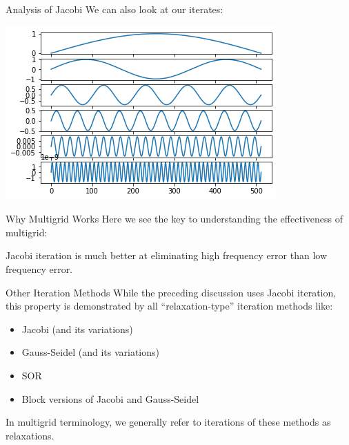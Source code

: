 \documentclass[11pt]{beamer}
\begin{document}
\begin{frame}{Analysis of Jacobi}
  We can also look at our iterates:
  \begin{center}
    \includegraphics[width=\linewidth]{output_14_0.png}
  \end{center}
\end{frame}
\begin{frame}{Why Multigrid Works}
  Here we see the key to understanding the effectiveness of multigrid:

  Jacobi iteration is much better at eliminating high frequency error than low frequency error.
\end{frame}
\begin{frame}{Other Iteration Methods}
  While the preceding discussion uses Jacobi iteration, this property is
  demonstrated by all ``relaxation-type'' iteration methods like:
  \begin{itemize}
    \item Jacobi (and its variations)
    \item Gauss-Seidel (and its variations)
    \item SOR
    \item Block versions of Jacobi and Gauss-Seidel
  \end{itemize}
  In multigrid terminology, we generally refer to iterations of these methods
  as relaxations.
\end{frame}
\end{document}
